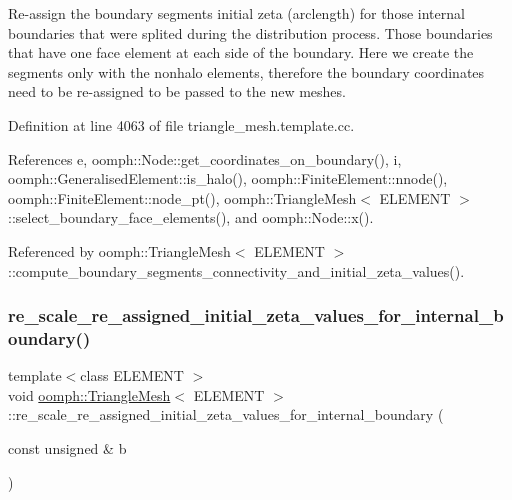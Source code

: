 Re-\/assign the boundary segments initial zeta (arclength) for those internal boundaries that were splited during the distribution process. Those boundaries that have one face element at each side of the boundary. Here we create the segments only with the nonhalo elements, therefore the boundary coordinates need to be re-\/assigned to be passed to the new meshes. 

Definition at line 4063 of file triangle\+\_\+mesh.\+template.\+cc.



References e, oomph\+::\+Node\+::get\+\_\+coordinates\+\_\+on\+\_\+boundary(), i, oomph\+::\+Generalised\+Element\+::is\+\_\+halo(), oomph\+::\+Finite\+Element\+::nnode(), oomph\+::\+Finite\+Element\+::node\+\_\+pt(), oomph\+::\+Triangle\+Mesh$<$ E\+L\+E\+M\+E\+N\+T $>$\+::select\+\_\+boundary\+\_\+face\+\_\+elements(), and oomph\+::\+Node\+::x().



Referenced by oomph\+::\+Triangle\+Mesh$<$ E\+L\+E\+M\+E\+N\+T $>$\+::compute\+\_\+boundary\+\_\+segments\+\_\+connectivity\+\_\+and\+\_\+initial\+\_\+zeta\+\_\+values().

\mbox{\label{classoomph_1_1TriangleMesh_a6a33a04b552311d9c9c258fa40e262de}} 
\subsubsection{\texorpdfstring{re\+\_\+scale\+\_\+re\+\_\+assigned\+\_\+initial\+\_\+zeta\+\_\+values\+\_\+for\+\_\+internal\+\_\+boundary()}{re\_scale\_re\_assigned\_initial\_zeta\_values\_for\_internal\_boundary()}}
{\footnotesize\ttfamily template$<$class E\+L\+E\+M\+E\+NT $>$ \\
void \hyperlink{classoomph_1_1TriangleMesh}{oomph\+::\+Triangle\+Mesh}$<$ E\+L\+E\+M\+E\+NT $>$\+::re\+\_\+scale\+\_\+re\+\_\+assigned\+\_\+initial\+\_\+zeta\+\_\+values\+\_\+for\+\_\+internal\+\_\+boundary (\begin{DoxyParamCaption}\item[{const unsigned \&}]{b }\end{DoxyParamCaption})}



